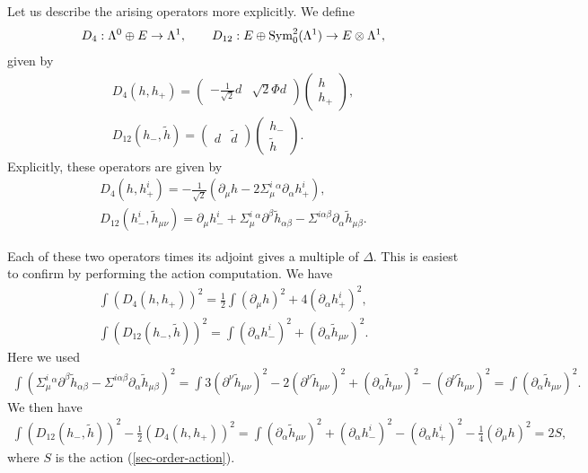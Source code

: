 \documentclass[10pt]{report}
\theoremstyle{definition}
\begin{document}
Let us describe the arising operators more explicitly. We define
\begin{align}
D_4: \Lambda^0 \oplus E \to \Lambda^1, \qquad D_{12}: E \oplus {\rm Sym}^2_0(\Lambda^1) \to E\otimes \Lambda^1,
\end{align}
given by
\begin{align}
D_4 (h,h_+) = \left( \begin{array}{cc} - \frac{1}{\sqrt{2}} d & \sqrt{2} \Phi d\end{array}\right) \left( \begin{array}{c} h \\ h_+\end{array}\right), \\ \nonumber
D_{12} (h_-, \tilde{h}) = \left( \begin{array}{cc} d & \tilde{d} \end{array}\right) \left( \begin{array}{c} h_- \\ \tilde{h} \end{array}\right).
\end{align}
Explicitly, these operators are given by
\begin{align}\label{d4-d12}
D_4 (h,h^i_+) = 
- \frac{1}{\sqrt{2}} \left( \partial_\mu h - 2\Sigma^i_\mu{}^\alpha \partial_\alpha h^i_+ \right), \\ \nonumber
 D_{12} (h^i_-, \tilde{h}_{\mu\nu})  =  \partial_\mu h^i_- + \Sigma^i_\mu{}^\alpha\partial^\beta \tilde{h}_{\alpha\beta} -  \Sigma^{i\alpha\beta} \partial_\alpha \tilde{h}_{\mu\beta}.
\end{align}

Each of these two operators times its adjoint gives a multiple of $\Delta$. This is easiest to confirm by performing the action computation. We have 
\begin{align}
\int (D_4 (h,h_+) )^2 = \frac{1}{2} \int  (\partial_\mu h)^2 + 4(\partial_\alpha h^i_+)^2, \\ \nonumber
\int (D_{12} (h_-, \tilde{h}))^2 = \int (\partial_\alpha h^i_-)^2 + (\partial_\alpha \tilde{h}_{\mu\nu})^2.
\end{align}
Here we used
\begin{align}\nonumber
\int ( \Sigma^i_\mu{}^\alpha\partial^\beta \tilde{h}_{\alpha\beta} -  \Sigma^{i\alpha\beta} \partial_\alpha \tilde{h}_{\mu\beta})^2=\int 3 (\partial^\nu \tilde{h}_{\mu\nu})^2 - 2 (\partial^\nu \tilde{h}_{\mu\nu})^2+ (\partial_\alpha \tilde{h}_{\mu\nu})^2 - (\partial^\nu \tilde{h}_{\mu\nu})^2 = \int (\partial_\alpha \tilde{h}_{\mu\nu})^2.
\end{align}
We then have
\begin{align}
\int (D_{12} (h_-, \tilde{h}))^2 - \frac{1}{2} (D_4 (h,h_+) )^2 = \int (\partial_\alpha \tilde{h}_{\mu\nu})^2 + (\partial_\alpha h^i_-)^2 - (\partial_\alpha h^i_+)^2 - \frac{1}{4} (\partial_\mu h)^2 = 2S,
\end{align}
where $S$ is the action (\ref{sec-order-action}).
\end{document}

